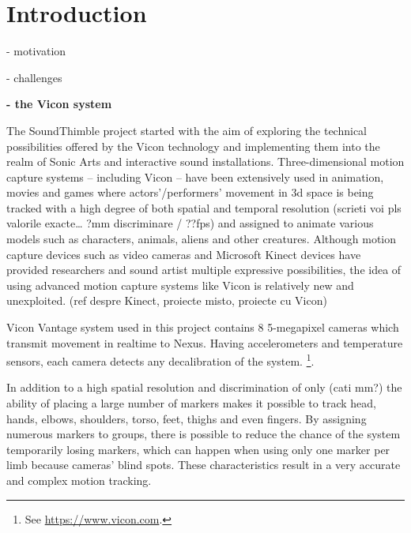 \documentclass{nime-alternate}
\begin{document}





\section{Introduction}

- motivation

- challenges

\textbf{- the Vicon system}\\ \par

The SoundThimble project started with the aim of exploring the technical possibilities offered by the Vicon technology and implementing them into the realm of Sonic Arts and interactive sound installations. Three-dimensional motion capture systems – including Vicon – have been extensively used in animation, movies and games where actors’/performers’ movement in 3d space is being tracked with a high degree of both spatial and temporal resolution (scrieti voi pls valorile exacte… ?mm discriminare / ??fps) and assigned to animate various models such as characters, animals, aliens and other creatures. Although motion capture devices such as video cameras and Microsoft Kinect  devices have provided researchers and sound artist multiple expressive possibilities, the idea of using advanced motion capture systems like Vicon is relatively new and unexploited. (ref despre Kinect, proiecte misto, proiecte cu Vicon) 

Vicon Vantage system used in this project contains 8 5-megapixel cameras which transmit movement in realtime to Nexus. Having accelerometers and temperature sensors, each camera detects any decalibration of the system. \footnote{See  \url{https://www.vicon.com}.}.

In addition to a high spatial resolution and discrimination of only (cati mm?) the ability of placing a large number of markers makes it possible to track head, hands, elbows, shoulders, torso, feet, thighs and even fingers. By assigning numerous markers to groups, there is possible to  reduce the chance of the system temporarily losing markers, which can happen when using only one marker per limb because cameras' blind spots. These characteristics result in a very accurate and complex motion tracking.
\end{document}
